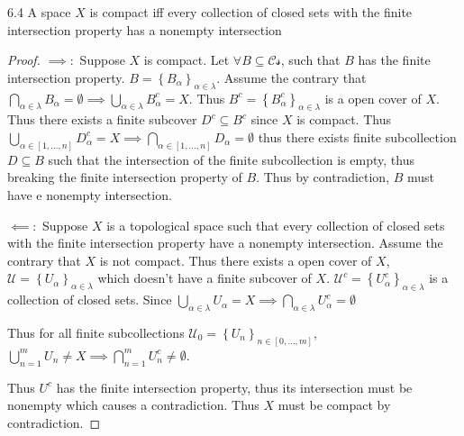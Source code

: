 \documentclass{article}
\begin{document}
\begin{claim}{6.4}\label{Claim 6.4.}
    A space $X$ is compact iff every collection of closed sets with the finite intersection property has a nonempty intersection 
\end{claim}
\begin{proof}
    $\implies:$ Suppose $X$ is compact. Let $\forall B \subseteq \mathcal{Cs}$, such that $B$ has the finite intersection property. $B = \left\{ B_\alpha \right\}_{\alpha \in \lambda}$.  Assume the contrary that $\bigcap_{\alpha \in \lambda} B_\alpha = \emptyset \implies \bigcup_{\alpha \in \lambda} B_{\alpha}^c = X$. Thus $B^c = \left\{ B_{\alpha}^c \right\}_{\alpha \in \lambda}$ is a open cover of $X$. Thus there exists a finite subcover $D^c \subseteq B^c$ since $X$ is compact. Thus $\bigcup_{\alpha \in [1, \dots, n]} D^c_\alpha = X \implies \bigcap_{\alpha \in [1, \dots, n]}D_\alpha = \emptyset$ thus there exists finite subcollection $D \subseteq B$ such that the intersection of the finite subcollection is empty, thus breaking the finite intersection property of $B$. Thus by contradiction, $B$ must have e nonempty intersection.
    
    $\impliedby:$ Suppose $X$ is a topological space such that every collection of closed sets with the finite intersection property have a nonempty intersection. Assume the contrary that $X$ is not compact. Thus there exists a open cover of $X$, $\mathcal{U} = \left\{ U_\alpha \right\}_{\alpha \in \lambda}$ which doesn't have a finite subcover of $X$. $\mathcal{U}^c = \left\{ U_\alpha^c \right\}_{\alpha \in \lambda}$ is a collection of closed sets. Since $\bigcup_{\alpha \in \lambda} U_\alpha = X \implies \bigcap_{\alpha \in \lambda} U_\alpha^c = \emptyset$ 
    
    Thus for all finite subcollections $\mathcal{U}_0 = \left\{ U_{n} \right\}_{n \in \left[0, \dots, m\right]}$, $\bigcup_{n = 1}^{m} U_n \neq X \implies \bigcap_{n = 1}^{m}U_n^c \neq \emptyset$. 
    
    Thus $U^c$ has the finite intersection property, thus its intersection must be nonempty which causes a contradiction. Thus $X$ must be compact by contradiction.  
\end{proof}

\bigskip
\end{document}
